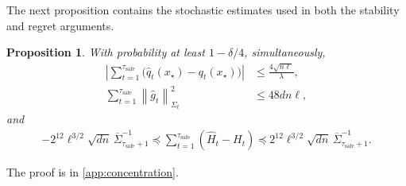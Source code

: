 \documentclass[11pt]{article}
\newtheorem{proposition}[proposition]{Proposition}
\newcommand{\1}{\mathbf 1}
\newcommand{\normm}[2]{\left\lVert #1\right\rVert_{#2}}
\begin{document}
The next proposition contains the stochastic estimates used in both the
stability and regret arguments.
\begin{proposition}
    \label{prop:concentration}
    With probability at least $1-\delta/4$, simultaneously,
    \begin{align}
        \left|
        \sum_{t=1}^{\tau_{\mathrm{safe}}}
        \bigl(\widehat q_t(x_\star)-q_t(x_\star)\bigr)
        \right|
         & \leq
        \frac{4\sqrt{n\ell}}{\lambda},
        \label{eq:q-concentration}
        \\
        \sum_{t=1}^{\tau_{\mathrm{safe}}}
        \normm{\widehat g_t}{\Sigma_t}^2
         & \leq
        48dn\ell,
        \label{eq:gradient-energy}
    \end{align}
    and
    \begin{align}
        -2^{12}\ell^{3/2}\sqrt{dn}\,
        \overline\Sigma_{\tau_{\mathrm{safe}}+1}^{-1}
        \preceq
        \sum_{t=1}^{\tau_{\mathrm{safe}}}
        (\widehat H_t-H_t)
        \preceq
        2^{12}\ell^{3/2}\sqrt{dn}\,
        \overline\Sigma_{\tau_{\mathrm{safe}}+1}^{-1}.
        \label{eq:H-concentration}
    \end{align}
\end{proposition}

The proof is in \cref{app:concentration}.
\end{document}
